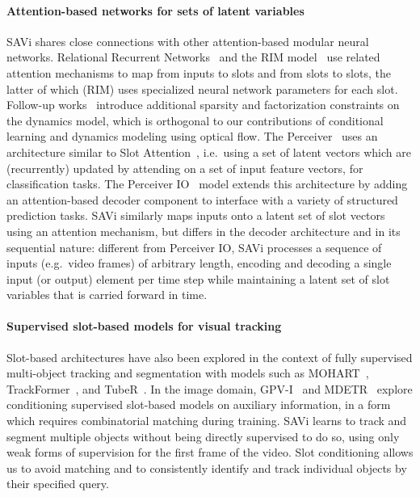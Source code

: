 \documentclass{article}
\newcommand{\modelname}{SAVi\xspace}
\begin{document}
\paragraph{Attention-based networks for sets of latent variables}
\modelname shares close connections with other attention-based modular neural networks. Relational Recurrent Networks~\citep{santoro2018relational} and the RIM model~\citep{goyal2019recurrent} use related attention mechanisms to map from inputs to slots and from slots to slots, the latter of which (RIM) uses specialized neural network parameters for each slot. Follow-up works~\citep{goyal2021factorizing,goyal2021neural} introduce additional sparsity and factorization constraints on the dynamics model, which is orthogonal to our contributions of conditional learning and dynamics modeling using optical flow. The Perceiver~\citep{jaegle2021perceiver} uses an architecture similar to Slot Attention~\citep{locatello2020object}, i.e.~using a set of latent vectors which are (recurrently) updated by attending on a set of input feature vectors, for classification tasks. The Perceiver IO~\citep{jaegle2021perceiverio} model extends this architecture by adding an attention-based decoder component to interface with a variety of structured prediction tasks. SAVi similarly maps inputs onto a latent set of slot vectors using an attention mechanism, but differs in the decoder architecture and in its sequential nature: different from Perceiver IO, SAVi processes a sequence of inputs (e.g.~video frames) of arbitrary length, encoding and decoding a single input (or output) element per time step while maintaining a latent set of slot variables that is carried forward in time.


\paragraph{Supervised slot-based models for visual tracking}
Slot-based architectures have also been explored in the context of fully supervised multi-object tracking and segmentation with models such as MOHART~\citep{fuchs2019end}, TrackFormer~\citep{meinhardt2021trackformer}, and TubeR~\citep{zhao2021tuber}. In the image domain,  GPV-I~\citep{gupta2021towards} and MDETR~\citep{kamath2021mdetr,carion2020detr} explore conditioning supervised slot-based models on auxiliary information, in a form which requires combinatorial matching during training. \modelname learns to track and segment multiple objects without being directly supervised to do so, using only weak forms of supervision for the first frame of the video. Slot conditioning allows us to avoid matching and to consistently identify and track individual objects by their specified query.
\end{document}
